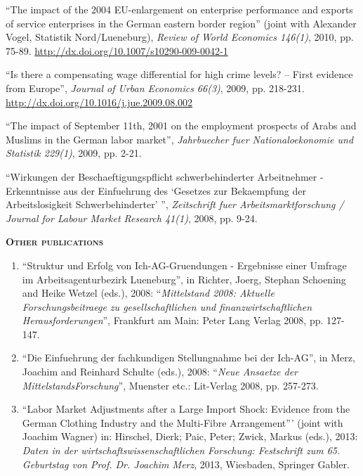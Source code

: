 \documentclass[10pt,pdftex,a4paper,oneside]{article}
\begin{document}
\begin{etaremune}
\item ``The impact of the 2004 EU-enlargement on enterprise performance and exports of service enterprises in the German eastern border region'' (joint with Alexander Vogel, Statistik Nord/Lueneburg), \emph{Review of World Economics 146(1)}, 2010, pp. 75-89.   \url{http://dx.doi.org/10.1007/s10290-009-0042-1}
\item ``Is there a compensating wage differential for high crime levels? -- First evidence from Europe'', \emph{Journal of Urban Economics 66(3)}, 2009, pp. 218-231.   \url{http://dx.doi.org/10.1016/j.jue.2009.08.002}
\item ``The impact of September 11th, 2001 on the employment prospects of Arabs and Muslims in the German labor market'', \emph{Jahrbuecher fuer Nationaloekonomie und Statistik 229(1)}, 2009, pp. 2-21.
\item ``Wirkungen der Beschaeftigungspflicht schwerbehinderter Arbeitnehmer - Erkenntnisse aus der Einfuehrung des `Gesetzes zur Bekaempfung der Arbeitslosigkeit Schwerbehinderter' {''}, \emph{Zeitschrift fuer Arbeitsmarktforschung / Journal for Labour Market Research 41(1)}, 2008,  pp. 9-24.
\end{etaremune}


\textbf{\textsc{Other publications}}
\begin{enumerate}
\item ``Struktur und Erfolg von Ich-AG-Gruendungen - Ergebnisse einer Umfrage im Arbeitsagenturbezirk Lueneburg'', in Richter, Joerg, Stephan Schoening and Heike Wetzel (eds.), 2008: ``\emph{Mittelstand 2008: Aktuelle Forschungsbeitraege zu gesellschaftlichen und finanzwirtschaftlichen Herausforderungen}'', Frankfurt am Main: Peter Lang Verlag 2008, pp. 127-147.
\item ``Die Einfuehrung der fachkundigen Stellungnahme bei der Ich-AG'', in Merz, Joachim and Reinhard Schulte (eds.), 2008: ``\emph{Neue Ansaetze der MittelstandsForschung}'', Muenster etc.: Lit-Verlag 2008, pp. 257-273.
\item ``Labor Market Adjustments after a Large Import Shock: Evidence from the German Clothing Industry and the Multi-Fibre Arrangement''' (joint with Joachim Wagner) in: Hirschel, Dierk; Paic, Peter; Zwick, Markus (eds.), 2013: \emph{Daten in der wirtschaftswissenschaftlichen Forschung: Festschrift zum 65. Geburtstag von Prof. Dr. Joachim Merz}, 2013, Wiesbaden, Springer Gabler.
\end{enumerate}
\end{document}
